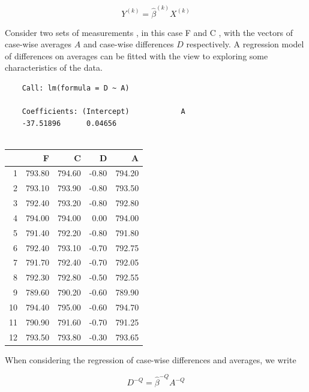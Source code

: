 \documentclass[12pt, a4paper]{report}
\theoremstyle{plain}
\theoremstyle{definition}
\theoremstyle{remark}
\begin{document}
	\begin{equation}
	Y^{(k)} = \hat{\beta}^{(k)}X^{(k)}
	\end{equation}
	
	Consider two sets of measurements , in this case F and C , with the vectors of case-wise averages $A$ and case-wise differences $D$ respectively. A regression model of differences on averages can be fitted with the view to exploring some characteristics of the data.
	
	\begin{verbatim}
	Call: lm(formula = D ~ A)
	
	Coefficients: (Intercept)            A
	-37.51896      0.04656
	
	\end{verbatim}
	
	
	
	\begin{table}[ht]
		\begin{center}
			\begin{tabular}{rrrrr}
				\hline
				& F & C & D & A \\
				\hline
				1 & 793.80 & 794.60 & -0.80 & 794.20 \\
				2 & 793.10 & 793.90 & -0.80 & 793.50 \\
				3 & 792.40 & 793.20 & -0.80 & 792.80 \\
				4 & 794.00 & 794.00 & 0.00 & 794.00 \\
				5 & 791.40 & 792.20 & -0.80 & 791.80 \\
				6 & 792.40 & 793.10 & -0.70 & 792.75 \\
				7 & 791.70 & 792.40 & -0.70 & 792.05 \\
				8 & 792.30 & 792.80 & -0.50 & 792.55 \\
				9 & 789.60 & 790.20 & -0.60 & 789.90 \\
				10 & 794.40 & 795.00 & -0.60 & 794.70 \\
				11 & 790.90 & 791.60 & -0.70 & 791.25 \\
				12 & 793.50 & 793.80 & -0.30 & 793.65 \\
				\hline
			\end{tabular}
		\end{center}
	\end{table}
	
	When considering the regression of case-wise differences and
	averages, we write
	
	\begin{equation}
	D^{-Q} = \hat{\beta}^{-Q}A^{-Q}
	\end{equation}
	
\end{document}
